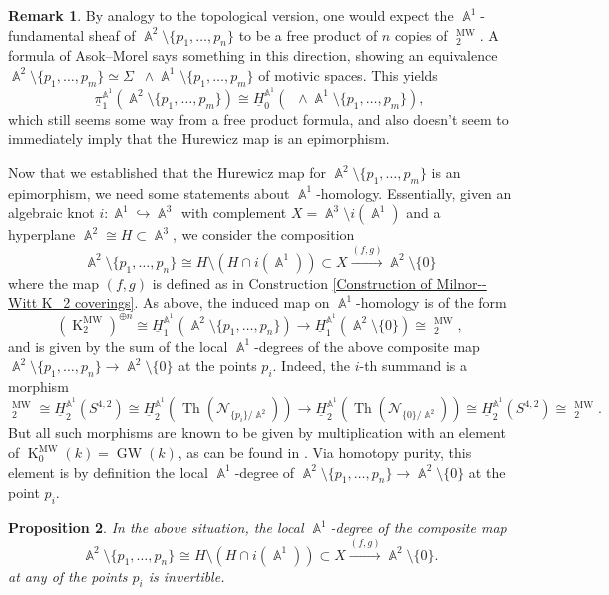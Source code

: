 \documentclass[english]{amsart}
\newtheorem{prop}{Proposition}[section]
\theoremstyle{definition}
\newtheorem{rem}[prop]{Remark}
\DeclareMathOperator{\A}{\mathbb{A}}
\DeclareMathOperator{\Gm}{\mathbb{G}_m}
\DeclareMathOperator{\K}{K}
\DeclareMathOperator{\KK}{\underline{K}}
\DeclareMathOperator{\GW}{GW}
\DeclareMathOperator{\MW}{MW}
\DeclareMathOperator{\Th}{Th}
\begin{document}
\begin{rem}
By analogy to the topological version, one would expect the $\A^1$-fundamental sheaf of $\A^2 \setminus \{ p_1,\dots,p_n \}$ to be a free product of $n$ copies of $\KK^{\MW}_2$. A formula of Asok--Morel \cite{asok:morel} says something in this direction, showing an equivalence $\A^2 \setminus \{ p_1,\dots,p_m \} \simeq \Sigma \! \Gm \wedge \A^1 \setminus \{ p_1,\dots,p_m \}$ of motivic spaces. This yields
\[
\underline{\pi}_1^{\A^1}\!(\A^2\setminus\{p_1,\dots,p_m\})\cong \underline{H}_0^{\A^1}\!(\Gm \wedge \A^1 \setminus\{ p_1,\dots,p_m \}),
\]
which still seems some way from a free product formula, and also doesn't seem to immediately imply that the Hurewicz map is an epimorphism. 
\end{rem}

Now that we established that the Hurewicz map for $\A^2 \setminus \{ p_1,\dots,p_m \}$ is an epimorphism, we need some statements about $\A^1$-homology. Essentially, given an algebraic knot $i \colon \A^1 \hookrightarrow \A^3$ with complement $X = \A^3 \setminus i(\A^1)$ and a hyperplane $\A^2 \cong H \subset \A^3$, we consider the composition 
\[
\A^2\setminus\{p_1,\dots,p_n\}\cong H\setminus(H\cap i(\A^1))\subset X\xrightarrow{(f,g)}\A^2\setminus\{0\}
\]
where the map $(f,g)$ is defined as in Construction \ref{Construction of Milnor--Witt K_2 coverings}. As above, the induced map on $\A^1$-homology is of the form 
$$(\K^{\MW}_2)^{\oplus n} \cong \underline{H}_1^{\A^1} \! (\A^2 \setminus \{ p_1,\dots,p_n \}) \to \underline{H}_1^{\A^1} \! (\A^2 \setminus \{ 0 \}) \cong \KK^{\MW}_2,$$
and is given by the sum of the local $\A^1$-degrees of the above composite map $\A^2\setminus\{p_1,\dots,p_n\}\to\A^2\setminus\{0\}$ at the points $p_i$. Indeed, the $i$-th summand is a morphism
$$\KK^{\MW}_2 \cong \underline{H}_2^{\A^1}\!(S^{4,2}) \cong \underline{H}_2^{\A^1}\!(\Th(\mathcal{N}_{\{p_i \}/\A^2})) \to \underline{H}_2^{\A^1}\!(\Th(\mathcal{N}_{\{0 \}/\A^2})) \cong \underline{H}_2^{\A^1}\!(S^{4,2}) \cong \KK^{\MW}_2.$$
But all such morphisms are known to be given by multiplication with an element of $\K^{\MW}_0(k) = \GW(k)$, as can be found in \cite[Corollary 5.2]{MR4874195}. Via homotopy purity, this element is by definition the local $\A^1$-degree of $\A^2\setminus\{p_1,\dots,p_n\}\to\A^2\setminus\{0\}$ at the point $p_i$.
\begin{prop}
\label{prop:a1-local-degree}
In the above situation, the local $\A^1$-degree of the composite map 
\[
\A^2\setminus\{p_1,\dots,p_n\}\cong H\setminus(H\cap i(\A^1))\subset X\xrightarrow{(f,g)}\A^2\setminus\{0\}. 
\]
at any of the points $p_i$ is invertible. 
\end{prop}
\end{document}
